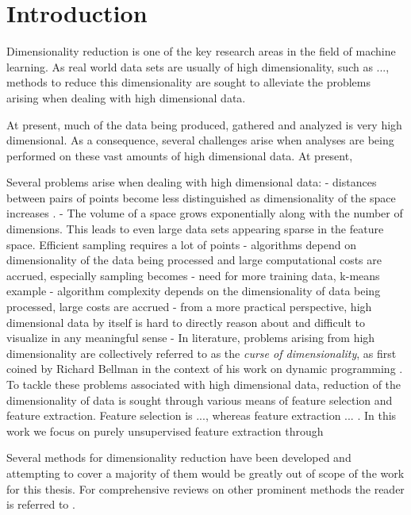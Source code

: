 \chapter{Introduction}
\label{ch:introduction}

Dimensionality reduction is one of the key research areas in the field of machine learning. As real world data sets are usually of high dimensionality, such as ..., methods to reduce this dimensionality are sought to alleviate the problems arising when dealing with high dimensional data. 

At present, much of the data being produced, gathered and analyzed is very high dimensional. As a consequence, several challenges arise when analyses are being performed on these vast amounts of high dimensional data.
At present, 

Several problems arise when dealing with high dimensional data:
- distances between pairs of points become less distinguished as dimensionality of the space increases \cite{on_the_surprising_behavior_of_distance_metrics}.
- The volume of a space grows exponentially along with the number of dimensions. This leads to even large data sets appearing sparse in the feature space. Efficient sampling requires a lot of points
- algorithms depend on dimensionality of the data being processed and large computational costs are accrued, especially sampling becomes
- need for more training data, k-means example \cite[p.~263]{understanding_machine_learning}
- algorithm complexity depends on the dimensionality of data being processed, large costs are accrued
- from a more practical perspective, high dimensional data by itself is hard to directly reason about and difficult to visualize in any meaningful sense
- In literature, problems arising from high dimensionality are collectively referred to as the \textit{curse of dimensionality}, as first coined by Richard Bellman in the context of his work on dynamic programming \cite{bellman_curse_of_dimensionality}.
To tackle these problems associated with high dimensional data, reduction of the dimensionality of data is sought through various means of feature selection and feature extraction. Feature selection is ..., whereas feature extraction ... . In this work we focus on purely unsupervised feature extraction through 

Several methods for dimensionality reduction have been developed and attempting to cover a majority of them would be greatly out of scope of the work for this thesis. For comprehensive reviews on other prominent methods the reader is referred to \cite{first_dimensionality_reduction_review, second_dimensionality_reduction_review}.

